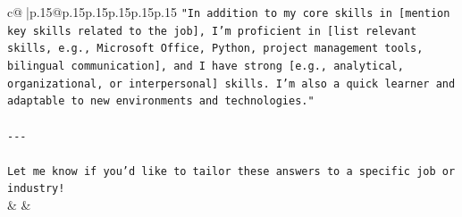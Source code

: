 \documentclass{article}
\begin{document}
{\begin{supertabular}{c@{$\;$}|p{.15\linewidth}@{}p{.15\linewidth}p{.15\linewidth}p{.15\linewidth}p{.15\linewidth}p{.15\linewidth}}
{{{\texttt{"In addition to my core skills in {[}mention key skills related to the job{]}, I’m proficient in {[}list relevant skills, e.g., Microsoft Office, Python, project management tools, bilingual communication{]}, and I have strong {[}e.g., analytical, organizational, or interpersonal{]} skills. I’m also a quick learner and adaptable to new environments and technologies."} \\
\\ 
\texttt{{-}{-}{-}} \\
\\ 
\texttt{Let me know if you'd like to tailor these answers to a specific job or industry!} \\
            }
        }
    }
    & & \\ \\


\end{supertabular}}
\end{document}
